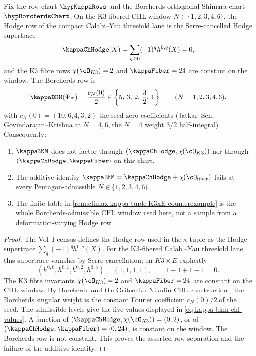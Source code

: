 \begin{theorem}
\label{thm:kappa-tuple-primitivity-orthogonal-shimura}%
%
%
Fix the row chart \(\hypKappaRows\) and the Borcherds
orthogonal-Shimura chart \(\hypBorcherdsChart\). On the K3-fibered
CHL window \(N\in\{1,2,3,4,6\}\), the Hodge row of the compact
Calabi--Yau threefold lane is the Serre-cancelled Hodge supertrace
\begin{equation}\label{eq:kappa-hodge-serre-zero}
 \kappaChHodge(X)
 =
 \sum_{q\ge0}(-1)^q h^{0,q}(X)
 =
0,
\end{equation}
and the K3 fibre rows \(\chi(\cO_{K3})=2\) and
\(\kappaFiber=24\) are constant on the window.  The Borcherds row is
\begin{equation}\label{eq:kappa-bkm-chl-values}
 \kappaBKM(\Phi_N)=\frac{c_N(0)}{2}
 \in
 \left\{5,\,3,\,2,\,\frac32,\,1\right\}
 \qquad
 (N=1,2,3,4,6),
\end{equation}
with $c_N(0) = (10, 6, 4, 3, 2)$ the seed zero-coefficients
(Jatkar--Sen; Govindarajan--Krishna at $N = 4, 6$, the $N = 4$
weight $3/2$ half-integral). Consequently:
\begin{enumerate}[label=\textup{(\arabic*)}]
\item \(\kappaBKM\) does not factor through
\((\kappaChHodge,\chi(\cO_{K3}))\) nor through
\((\kappaChHodge,\kappaFiber)\) on this chart.
\item The additive identity
\(\kappaBKM=\kappaChHodge+\chi(\cO_{\mathrm{fiber}})\) fails at every
Pentagon-admissible \(N\in\{1,2,3,4,6\}\).
\item The finite table in
\cref{rem:climax-kappa-tuple-K3xE-counterexample} is the whole
Borcherds-admissible CHL window used here, not a sample from a
deformation-varying Hodge row.
\end{enumerate}
\end{theorem}

\begin{proof}
The Vol~I census defines the Hodge row used in the \(\kappa\)-tuple as
the Hodge supertrace
\(\sum_q(-1)^q h^{0,q}(X)\).  For the K3-fibered Calabi--Yau
threefold lane this supertrace vanishes by Serre cancellation; on
\(K3\times E\) explicitly
\[
(h^{0,0},h^{0,1},h^{0,2},h^{0,3})=(1,1,1,1),
\qquad
1-1+1-1=0.
\]
The K3 fibre invariants \(\chi(\cO_{K3})=2\) and \(\kappaFiber=24\)
are constant on the CHL window.  By Borcherds
\cite[Theorem 13.3]{Borcherds95} and the
Gritsenko--Nikulin CHL construction
\cite[\S 3]{GritsenkoNikulin1998}, the Borcherds singular weight is
the constant Fourier coefficient \(c_N(0)/2\) of the seed.  The
admissible levels give the five values displayed in
\eqref{eq:kappa-bkm-chl-values}.  A function of
\((\kappaChHodge,\chi(\cO_{K3}))=(0,2)\), or of
\((\kappaChHodge,\kappaFiber)=(0,24)\), is constant on the window.
The Borcherds row is not constant.  This proves the asserted row
separation and the failure of the additive identity.
\end{proof}

